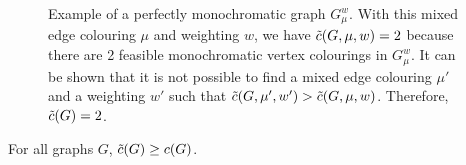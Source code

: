 \begin{figure}[H]
    \caption{Example of a perfectly monochromatic graph $G_\mu^w$.
        With this mixed edge colouring $\mu$ and weighting $w$, we have $\Tilde{c}(G, \mu, w) = 2$ because there are 2 feasible monochromatic vertex colourings in $G_\mu^w$.
        It can be shown that it is not possible to find a mixed edge colouring $\mu'$ and a weighting $w'$ such that $\Tilde{c}(G, \mu', w') > \Tilde{c}(G, \mu, w)$.
        Therefore, $\Tilde{c}(G) = 2$.}
    \label{fig:perfectly_mono}
\end{figure}

\begin{lemma}
    \label{lem:c_tilde_greater_than_c}
    For all graphs $G$, $\Tilde{c}(G) \geq c(G)$.
\end{lemma}

